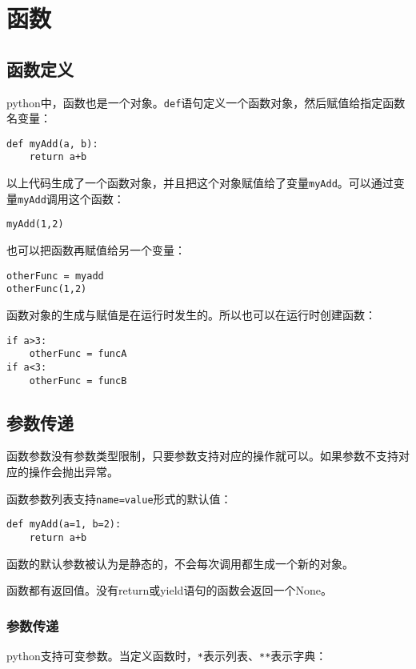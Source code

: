 
\chapter{函数}

	\section{函数定义}

		python中，函数也是一个对象。\verb|def|语句定义一个函数对象，然后赋值给指定函数名变量：

\begin{lstlisting}
def myAdd(a, b):
	return a+b
\end{lstlisting}

		以上代码生成了一个函数对象，并且把这个对象赋值给了变量\verb|myAdd|。可以通过变量\verb|myAdd|调用这个函数：

\begin{lstlisting}
myAdd(1,2)
\end{lstlisting}

		也可以把函数再赋值给另一个变量：

\begin{lstlisting}
otherFunc = myadd
otherFunc(1,2)
\end{lstlisting}

		函数对象的生成与赋值是在运行时发生的。所以也可以在运行时创建函数：

\begin{lstlisting}
if a>3:
	otherFunc = funcA
if a<3:
	otherFunc = funcB
\end{lstlisting}
		
	\section{参数传递}

		函数参数没有参数类型限制，只要参数支持对应的操作就可以。如果参数不支持对应的操作会抛出异常。

		函数参数列表支持\verb|name=value|形式的默认值：

\begin{lstlisting}
def myAdd(a=1, b=2):
	return a+b
\end{lstlisting}

		函数的默认参数被认为是静态的，不会每次调用都生成一个新的对象。

		函数都有返回值。没有return或yield语句的函数会返回一个None。

		\subsection{参数传递}
			python支持可变参数。当定义函数时，\verb|*|表示列表、\verb|**|表示字典：

